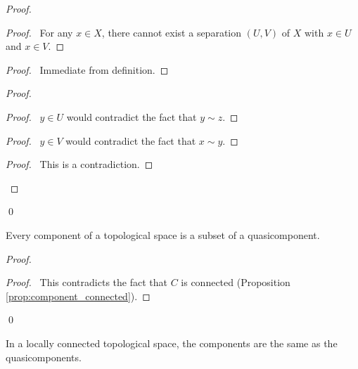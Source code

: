 \begin{proof}
\pf
{}
\begin{proof}
	\pf\ For any $x \in X$, there cannot exist a separation $(U,V)$ of $X$ with $x \in U$ and $x \in V$.
\end{proof}
\begin{proof}
	\pf\ Immediate from definition.
\end{proof}
\begin{proof}
	\begin{proof}
		\pf\ $y \in U$ would contradict the fact that $y \sim z$.
	\end{proof}
	\begin{proof}
		\pf\ $y \in V$ would contradict the fact that $x \sim y$.
	\end{proof}
	\qedstep
	\begin{proof}
		\pf\ This is a contradiction.
	\end{proof}
\end{proof}
\qed
\end{proof}

\begin{prop}
Every component of a topological space is a subset of a quasicomponent.
\end{prop}

\begin{proof}
\pf
{}
\qedstep
\begin{proof}
	\pf\ This contradicts the fact that $C$ is connected (Proposition \ref{prop:component_connected}).
\end{proof}
\qed
\end{proof}

\begin{prop}
In a locally connected topological space, the components are the same as the quasicomponents.
\end{prop}


